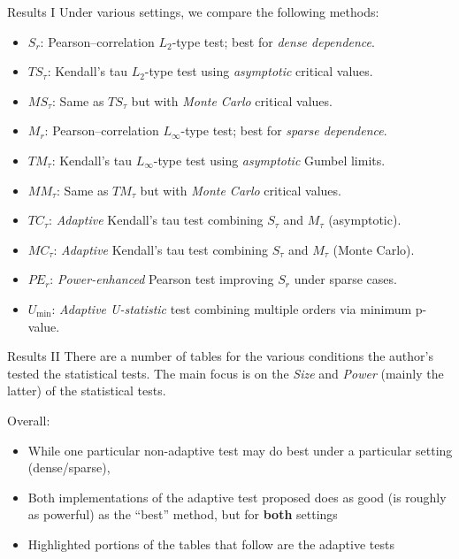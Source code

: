 \documentclass[
  ignorenonframetext,
]{beamer}
\providecommand{\tightlist}{%
  \setlength{\itemsep}{0pt}\setlength{\parskip}{0pt}}
\begin{document}
\begin{frame}{Results I}
\label{results-i}
Under various settings, we compare the following methods:

\begin{itemize}
\item
  \(S_r\): Pearson--correlation \(L_2\)-type test; best for \emph{dense
  dependence}.
\item
  \(TS_{\tau}\): Kendall's tau \(L_2\)-type test using \emph{asymptotic}
  critical values.
\item
  \(MS_{\tau}\): Same as \(TS_{\tau}\) but with \emph{Monte Carlo}
  critical values.
\item
  \(M_r\): Pearson--correlation \(L_{\infty}\)-type test; best for
  \emph{sparse dependence}.
\item
  \(TM_{\tau}\): Kendall's tau \(L_{\infty}\)-type test using
  \emph{asymptotic} Gumbel limits.
\item
  \(MM_{\tau}\): Same as \(TM_{\tau}\) but with \emph{Monte Carlo}
  critical values.
\item
  \(TC_{\tau}\): \emph{Adaptive} Kendall's tau test combining
  \(S_{\tau}\) and \(M_{\tau}\) (asymptotic).
\item
  \(MC_{\tau}\): \emph{Adaptive} Kendall's tau test combining
  \(S_{\tau}\) and \(M_{\tau}\) (Monte Carlo).
\item
  \(PE_r\): \emph{Power-enhanced} Pearson test improving \(S_r\) under
  sparse cases.
\item
  \(U_{\min}\): \emph{Adaptive U-statistic} test combining multiple
  orders via minimum p-value.
\end{itemize}
\end{frame}

\begin{frame}{Results II}
\label{results-ii}
There are a number of tables for the various conditions the author's
tested the statistical tests. The main focus is on the \emph{Size} and
\emph{Power} (mainly the latter) of the statistical tests.

Overall:

\begin{itemize}
\tightlist
\item
  While one particular non-adaptive test may do best under a particular
  setting (dense/sparse),
\item
  Both implementations of the adaptive test proposed does as good (is
  roughly as powerful) as the ``best'' method, but for \textbf{both}
  settings
\item
  Highlighted portions of the tables that follow are the adaptive tests
\end{itemize}
\end{frame}
\end{document}
